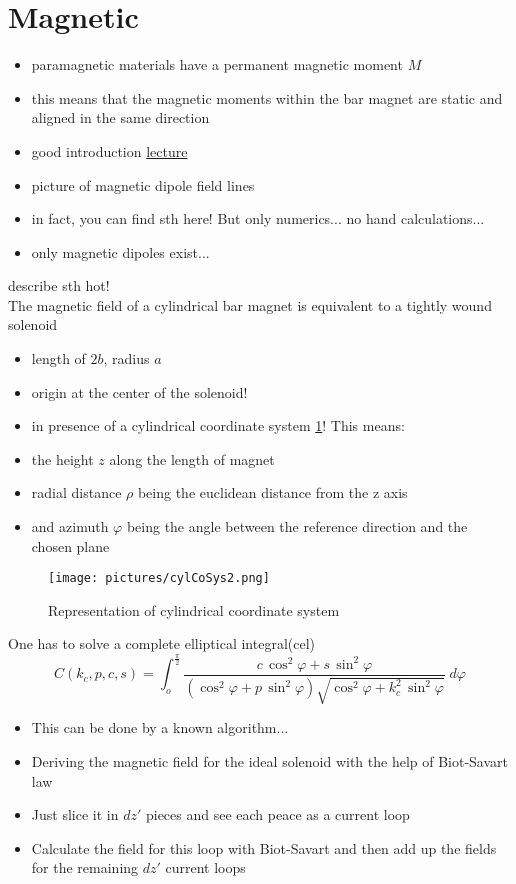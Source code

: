 \section{Magnetic}
\label{sec:magneticFound}

\begin{itemize}
\item paramagnetic materials have a permanent magnetic moment $ M $
\item this means that the magnetic moments within the bar magnet are static and aligned in the same direction
\item good introduction \href{http://www.ece.umd.edu/class/enee380-1.F2005/lectures/lecture24.htm}{lecture}
\item picture of magnetic dipole field lines
\item \cite{mladenovic2009magnetic} in fact, you can find sth here! But only numerics... no hand calculations...
\item only magnetic dipoles exist...
\end{itemize}

\cite{derby2010cylindrical} describe sth hot!\\
The magnetic field of a cylindrical bar magnet is equivalent to a tightly wound solenoid
\begin{itemize}
\item length of $ 2b $, radius $ a $
\item origin at the center of the solenoid!
\item in presence of a cylindrical coordinate system \ref{fig:cylCoSys}! This means:
\item the height $ z $ along the length of magnet
\item radial distance $ \rho $ being the euclidean distance from the z axis
\item and azimuth $ \varphi $ being the angle between the reference direction and the chosen plane
\end{itemize} 
\begin{figure}[h]
\centering
\texttt{[image: pictures/cylCoSys2.png]}
\label{fig:cylCoSys}
\caption{Representation of cylindrical coordinate system}
\end{figure}

One has to solve a complete elliptical integral(cel)
\begin{equation}
C(k_{c},p,c,s) = \int_{o}^{\frac{\pi}{2}} \frac{c \, \cos^{2}\varphi + s \, \sin^{2}\varphi}
{(\cos^{2}\varphi + p \, \sin^{2}\varphi)\sqrt{\cos^{2}\varphi + k_{c}^{2} \, \sin^{2}\varphi}} \; d\varphi
\end{equation}

\begin{itemize}
\item This can be done by a known algorithm...
\item Deriving the magnetic field for the ideal solenoid with the help of Biot-Savart law
\item Just slice it in $ dz' $ pieces and see each peace as a current loop 
\item Calculate the field for this loop with Biot-Savart and then add up the fields for the remaining $ dz' $ current loops
\end{itemize}

